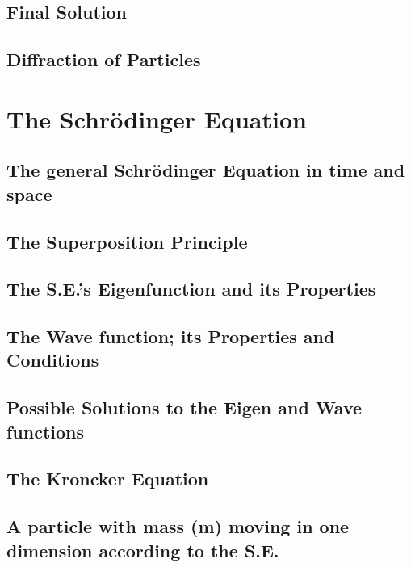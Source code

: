 \documentclass[colorlinks,11pt,a4paper,normalphoto,withhyper,ragged2e]{altareport}
\begin{document}
	
	\subsection{Final Solution}
	
	
	\subsection{Diffraction of Particles}
	
	
	\pagebreak
	
	
	
	
\section{The Schrödinger Equation}
	
	\subsection{The general Schrödinger Equation in time and space}
	
	
	\subsection{The Superposition Principle}
	
	
	\subsection{The S.E.’s Eigenfunction and its Properties}
	
	
	\subsection{The Wave function; its Properties and Conditions}
	
	
	\subsection{Possible Solutions to the Eigen and Wave functions}
	
	
	\subsection{The Kroncker Equation}
	
	
	\subsection{A particle with mass (m) moving in one dimension according to the S.E.}
	
\end{document}
